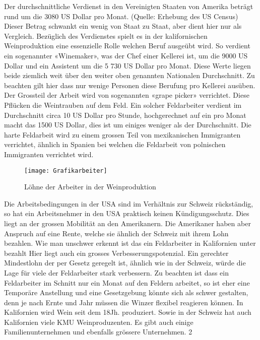 Der durchschnittliche Verdienst in den Vereinigten Staaten von Amerika beträgt rund um die 3080 US Dollar pro Monat. (Quelle: Erhebung des US Census) Dieser Betrag schwankt ein wenig von Staat zu Staat, aber dient hier nur als Vergleich. Bezüglich des Verdienstes spielt es in der kalifornischen Weinproduktion eine essenzielle Rolle welchen Beruf ausgeübt wird. So verdient ein sogenannter «Winemaker», was der Chef einer Kellerei ist, um die 9000 US
Dollar und ein Assistent um die 5 730 US Dollar pro Monat. Diese Werte liegen beide ziemlich weit über den weiter oben genannten Nationalen Durchschnitt. Zu beachten gilt hier dass nur wenige Personen diese Berufung pro Kellerei ausüben. Der Grossteil der Arbeit
wird von sogenannten «grape picker» verrichtet. Diese Pflücken die Weintrauben auf dem Feld. Ein solcher Feldarbeiter verdient im Durchschnitt circa 10 US Dollar pro Stunde,
\cite{_farm_????} hochgerechnet auf ein pro Monat macht das 1500 US Dollar, dies ist um einiges weniger als der Durchschnitt. Die harte Feldarbeit wird zu einem grossen Teil von mexikanischen Immigranten verrichtet, ähnlich in Spanien bei welchen die Feldarbeit von polnischen Immigranten verrichtet wird.
\begin{figure}[H]
	\centering
	\texttt{[image: Grafikarbeiter]}
	\caption{Löhne der Arbeiter in der Weinproduktion}
\end{figure}
Die Arbeitsbedingungen in der USA sind im Verhältnis zur Schweiz rückständig, so hat ein Arbeitsnehmer in den USA praktisch keinen Kündigungsschutz. Dies liegt an der grossen Mobilität an den Amerikanern. Die Amerikaner haben aber Anspruch auf eine Rente, welche sie ähnlich der Schweiz mit ihrem Lohn bezahlen. \cite{_arbeitszeiten_????} Wie man unschwer erkennt ist das ein Feldarbeiter in Kalifornien unter bezahlt Hier liegt auch ein grosses Verbesserungspotenzial. Ein gerechter Mindestlohn der per Gesetz geregelt ist, ähnlich wie in der Schweiz, würde die Lage für viele der Feldarbeiter stark verbessern. Zu beachten ist dass ein Feldarbeiter im Schnitt nur ein Monat auf den Feldern arbeitet, so ist eher eine Temporäre Anstellung und eine Gesetzgebung könnte sich als schwer gestalten, denn je nach Ernte und Jahr  müssen die Winzer flexibel reagieren können. In Kalifornien wird Wein seit dem 18Jh. produziert. Sowie in der Schweiz hat auch Kalifornien viele KMU Weinproduzenten. Es gibt auch einige Familienunternehmen und ebenfalls grössere Unternehmen. 2

